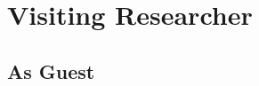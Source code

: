 \documentclass[11pt,a4paper,sans]{moderncv} %
\begin{document}

\section{Visiting Researcher}
\subsection{As Guest}








\end{document}
